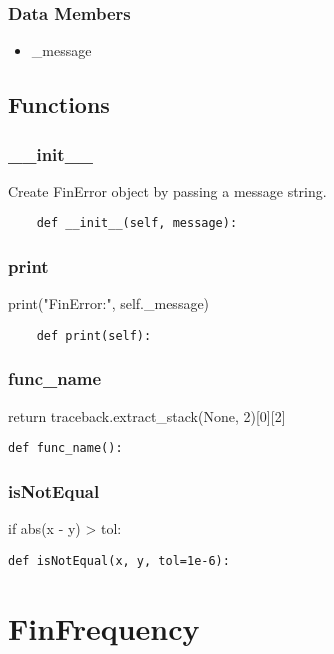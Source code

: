 \documentclass[twoside,11pt]{book}
\begin{document}
\subsubsection*{Data Members}
\begin{itemize}
\item{\_message}
\end{itemize}

\subsection*{Functions}

\subsubsection*{{\bf \_\_init\_\_}}
Create FinError object by passing a message string.  

\begin{lstlisting}
    def __init__(self, message):
\end{lstlisting}

\subsubsection*{{\bf print}}
print("FinError:", self.\_message) 

\begin{lstlisting}
    def print(self):
\end{lstlisting}

\subsubsection*{{\bf func\_name}}
return traceback.extract\_stack(None, 2)[0][2] 

\begin{lstlisting}
def func_name():
\end{lstlisting}

\subsubsection*{{\bf isNotEqual}}
if abs(x - y) > tol: 

\begin{lstlisting}
def isNotEqual(x, y, tol=1e-6):
\end{lstlisting}

\newpage
\section{FinFrequency}
\end{document}
